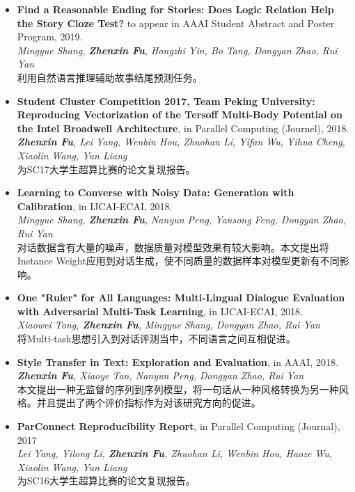 \documentclass[letterpaper]{article}
\def\footerlink{https://zhenxinfu.com/zhenxinfu.pdf}
\begin{document}
\begin{itemize}

\item \textbf{Find a Reasonable Ending for Stories: Does Logic Relation Help the Story Cloze Test?} to appear in AAAI Student Abstract and Poster Program, 2019. \\
{\it Mingyue Shang, \textbf{Zhenxin Fu}, Hongzhi Yin, Bo Tang, Dongyan Zhao, Rui Yan} \\
利用自然语言推理辅助故事结尾预测任务。

\item \textbf{Student Cluster Competition 2017, Team Peking University: Reproducing Vectorization of the Tersoff Multi-Body Potential on the Intel Broadwell Architecture}, in Parallel Computing (Journel), 2018. \\
{\it \textbf{Zhenxin Fu}, Lei Yang, Wenbin Hou, Zhuohan Li, Yifan Wu, Yihua Cheng, Xiaolin Wang, Yun Liang} \\
为SC17大学生超算比赛的论文复现报告。

\item \textbf{Learning to Converse with Noisy Data: Generation with Calibration}, in IJCAI-ECAI, 2018. \\
  {\it Mingyue Shang, \textbf{Zhenxin Fu}, Nanyun Peng, Yansong Feng, Dongyan Zhao, Rui Yan}  \\
  对话数据含有大量的噪声，数据质量对模型效果有较大影响。本文提出将Instance Weight应用到对话生成，使不同质量的数据样本对模型更新有不同影响。

\item \textbf{One "Ruler" for All Languages: Multi-Lingual Dialogue Evaluation with Adversarial Multi-Task Learning}, in IJCAI-ECAI, 2018. \\
  {\it Xiaowei Tong, \textbf{Zhenxin Fu}, Mingyue Shang, Dongyan Zhao, Rui Yan}  \\
  将Multi-task思想引入到对话评测当中，不同语言之间互相促进。

\item \textbf{Style Transfer in Text: Exploration and Evaluation}, in AAAI, 2018. \\
  {\it \textbf{Zhenxin Fu}, Xiaoye Tan, Nanyun Peng, Dongyan Zhao, Rui Yan} \\
  本文提出一种无监督的序列到序列模型，将一句话从一种风格转换为另一种风格。并且提出了两个评价指标作为对该研究方向的促进。
  
\item \textbf{ParConnect Reproducibility Report}, in Parallel Computing (Journal), 2017\\
  {\it Lei Yang, Yilong Li, \textbf{Zhenxin Fu}, Zhuohan Li, Wenbin Hou, Haoze Wu, Xiaolin Wang, Yun Liang} \\
  为SC16大学生超算比赛的论文复现报告。
\end{itemize}





\end{document}

